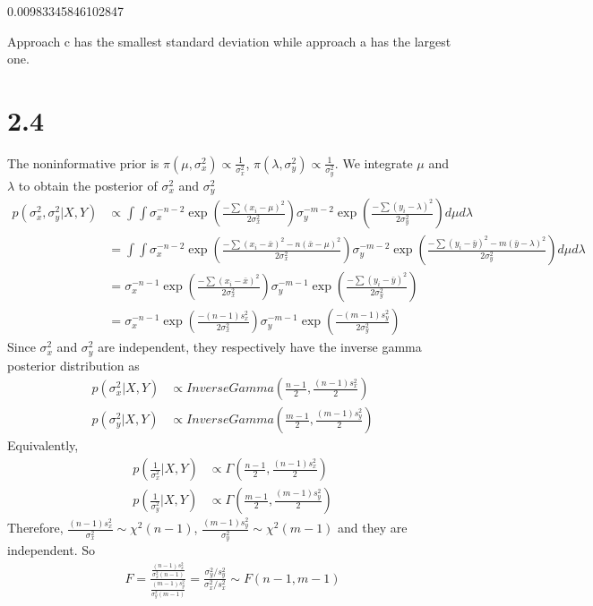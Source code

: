 \documentclass[11pt]{article}
\begin{document}
    0.00983345846102847

    
    Approach c has the smallest standard deviation while approach a has the
largest one.

    \hypertarget{section}{%
\section{2.4}\label{section}}

    The noninformative prior is
\(\pi(\mu,\sigma_x^2)\propto \frac{1}{\sigma_x^2}\),
\(\pi(\lambda,\sigma_y^2)\propto \frac{1}{\sigma_y^2}\). We integrate
\(\mu\) and \(\lambda\) to obtain the posterior of \(\sigma_x^2\) and
\(\sigma_y^2\) \[\begin{align}
    p(\sigma_x^2,\sigma_y^2|X,Y)&\propto \int\int \sigma_x^{-n-2}\exp(\frac{-\sum(x_i-\mu)^2}{2\sigma_x^2})\sigma_y^{-m-2}\exp(\frac{-\sum(y_i-\lambda)^2}{2\sigma_y^2}) d\mu d\lambda\\
    &= \int\int \sigma_x^{-n-2}\exp(\frac{-\sum(x_i-\bar{x})^2-n(\bar{x}-\mu)^2}{2\sigma_x^2})\sigma_y^{-m-2}\exp(\frac{-\sum(y_i-\bar{y})^2-m(\bar{y}-\lambda)^2}{2\sigma_y^2}) d\mu d\lambda \\
    &= \sigma_x^{-n-1}\exp(\frac{-\sum(x_i-\bar{x})^2}{2\sigma_x^2})\sigma_y^{-m-1}\exp(\frac{-\sum(y_i-\bar{y})^2}{2\sigma_y^2}) \\
    &= \sigma_x^{-n-1}\exp(\frac{-(n-1)s_x^2}{2\sigma_x^2})\sigma_y^{-m-1}\exp(\frac{-(m-1)s_y^2}{2\sigma_y^2})
\end{align}\] Since \(\sigma_x^2\) and \(\sigma_y^2\) are independent,
they respectively have the inverse gamma posterior distribution as
\[\begin{align}
    p(\sigma_x^2|X,Y)&\propto InverseGamma(\frac{n-1}{2}, \frac{(n-1)s_x^2}{2}) \\
    p(\sigma_y^2|X,Y)&\propto InverseGamma(\frac{m-1}{2}, \frac{(m-1)s_y^2}{2})
\end{align}\] Equivalently, \[\begin{align}
    p(\frac{1}{\sigma_x^2}|X,Y)&\propto \Gamma(\frac{n-1}{2}, \frac{(n-1)s_x^2}{2}) \\
    p(\frac{1}{\sigma_y^2}|X,Y)&\propto \Gamma(\frac{m-1}{2}, \frac{(m-1)s_y^2}{2})
\end{align}\] Therefore,
\(\frac{(n-1)s_x^2}{\sigma_x^2}\sim \chi^2(n-1)\),
\(\frac{(m-1)s_y^2}{\sigma_y^2}\sim \chi^2(m-1)\) and they are
independent. So \[\begin{align}
    F=\frac{\frac{(n-1)s_x^2}{\sigma_x^2(n-1)}}{\frac{(m-1)s_y^2}{\sigma_y^2(m-1)}}=\frac{\sigma_y^2/s_y^2}{\sigma_x^2/s_x^2}\sim F(n-1,m-1)
\end{align}\]
\end{document}
